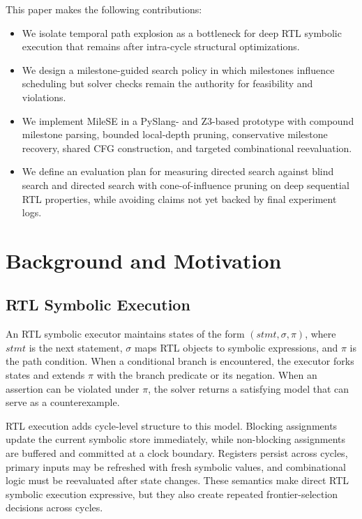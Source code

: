 \documentclass[conference]{IEEEtran}
\begin{document}
This paper makes the following contributions:
\begin{itemize}
    \item We isolate temporal path explosion as a bottleneck for deep RTL symbolic execution that remains after intra-cycle structural optimizations.
    \item We design a milestone-guided search policy in which milestones influence scheduling but solver checks remain the authority for feasibility and violations.
    \item We implement MileSE in a PySlang- and Z3-based prototype with compound milestone parsing, bounded local-depth pruning, conservative milestone recovery, shared CFG construction, and targeted combinational reevaluation.
    \item We define an evaluation plan for measuring directed search against blind search and directed search with cone-of-influence pruning on deep sequential RTL properties, while avoiding claims not yet backed by final experiment logs.
\end{itemize}

\section{Background and Motivation}
\label{sec:background}

\subsection{RTL Symbolic Execution}
An RTL symbolic executor maintains states of the form $(stmt,\sigma,\pi)$, where $stmt$ is the next statement, $\sigma$ maps RTL objects to symbolic expressions, and $\pi$ is the path condition. When a conditional branch is encountered, the executor forks states and extends $\pi$ with the branch predicate or its negation. When an assertion can be violated under $\pi$, the solver returns a satisfying model that can serve as a counterexample.

RTL execution adds cycle-level structure to this model. Blocking assignments update the current symbolic store immediately, while non-blocking assignments are buffered and committed at a clock boundary. Registers persist across cycles, primary inputs may be refreshed with fresh symbolic values, and combinational logic must be reevaluated after state changes. These semantics make direct RTL symbolic execution expressive, but they also create repeated frontier-selection decisions across cycles.
\end{document}
